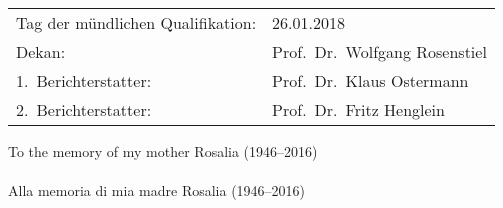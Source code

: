 {%
\vspace{\dimexpr \bigskipamount * 3 \relax}
%
\begin{tabular}{@{}ll@{}}
Tag der mündlichen Qualifikation: & 26.01.2018\\
Dekan:               & Prof.\ Dr.\ Wolfgang Rosenstiel\\
1.\ Berichterstatter: & Prof.\ Dr.\ Klaus Ostermann\\
2.\ Berichterstatter: & Prof.\ Dr.\ Fritz Henglein
\end{tabular}
%
\vspace{-1cm} %
%
%
\cleardoublepage
{%
\linespread{1}
\selectfont
\begin{flushright}
  To the memory of my mother Rosalia (1946--2016)\\
  ~\\
  Alla memoria di mia madre Rosalia (1946--2016)

\end{flushright}
} %
\cleardoublepage %
} %
